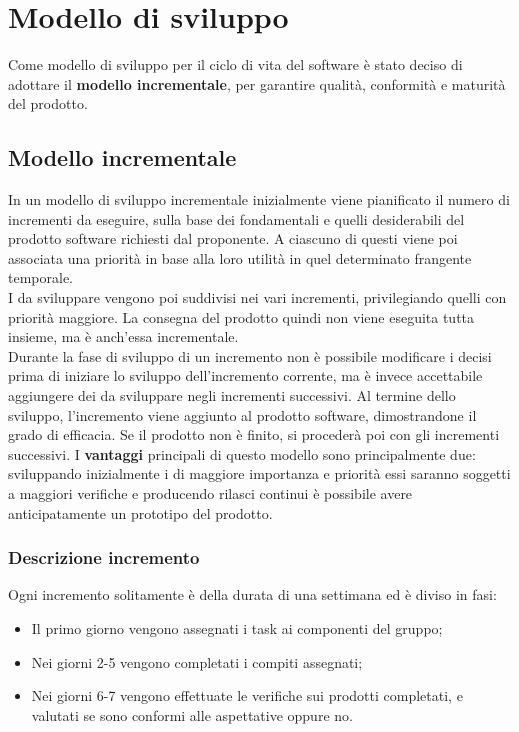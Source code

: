 \documentclass[PianoDiProgetto.tex]{subfiles}
\begin{document}
\chapter{Modello di sviluppo}
Come modello di sviluppo per il ciclo di vita del software è stato deciso di adottare il \textbf{modello incrementale}, per garantire qualità, conformità e maturità del prodotto.

\section{Modello incrementale}
In un modello di sviluppo incrementale inizialmente viene pianificato il numero di incrementi da eseguire, sulla base dei  fondamentali e quelli desiderabili del prodotto software richiesti dal proponente. A ciascuno di questi viene poi associata una priorità in base alla loro utilità in quel determinato frangente temporale.\\
I  da sviluppare vengono poi suddivisi nei vari incrementi, privilegiando quelli con priorità maggiore. La consegna del prodotto quindi non viene eseguita tutta insieme, ma è anch'essa incrementale.\\
Durante la fase di sviluppo di un incremento non è possibile modificare i  decisi prima di iniziare lo sviluppo dell'incremento corrente, ma è invece accettabile aggiungere dei  da sviluppare negli incrementi successivi. Al termine dello sviluppo, l'incremento viene aggiunto al prodotto software, dimostrandone il grado di efficacia. Se il prodotto non è finito, si procederà poi con gli incrementi successivi. I \textbf{vantaggi} principali di questo modello sono principalmente due: sviluppando inizialmente i  di maggiore importanza e priorità essi saranno soggetti a maggiori verifiche e producendo rilasci continui è possibile avere anticipatamente un prototipo del prodotto.

\subsection{Descrizione incremento}
Ogni incremento solitamente è della durata di una settimana ed è diviso in fasi:
\begin{itemize}
	\item Il primo giorno vengono assegnati i task ai componenti del gruppo;
	\item Nei giorni 2-5 vengono completati i compiti assegnati;
	\item Nei giorni 6-7 vengono effettuate le verifiche sui prodotti completati, e valutati se sono conformi alle aspettative oppure no.
\end{itemize}
\end{document}
